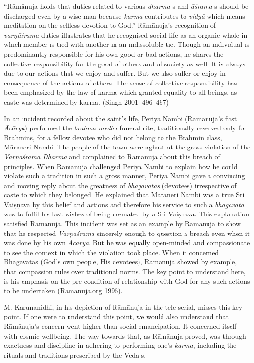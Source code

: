 “Rāmānuja holds that duties related to various \textit{dharma}-s and \textit{āśrama}-s should be discharged even by a wise man because \textit{karma} contributes to \textit{vidyā} which means meditation on the selfless devotion to God.” Rāmānuja’s recognition of \textit{varņāśrama} duties illustrates that he recognised social life as an organic whole in which member is tied with another in an indissoluble tie. Though an individual is predominantly responsible for his own good or bad actions, he shares the collective responsibility for the good of others and of society as well. It is always due to our actions that we enjoy and suffer. But we also suffer or enjoy in consequence of the actions of others. The sense of collective responsibility has been emphasized by the law of karma which granted equality to all beings, as caste was determined by karma. (Singh 2001: 496–497)

In an incident recorded about the saint’s life, Periya Nambi (Rāmānuja’s first \textit{Ācārya}) performed the \textit{brahma medha} funeral rite, traditionally reserved only for Brahmins, for a fellow devotee who did not belong to the Brahmin class, Māraneri Nambi. The people of the town were aghast at the gross violation of the \textit{Varņāśrama Dharma} and complained to Rāmānuja about this breach of principles. When Rāmānuja challenged Periya Nambi to explain how he could violate such a tradition in such a gross manner, Periya Nambi gave a convincing and moving reply about the greatness of \textit{bhāgavatas} (devotees) irrespective of caste to which they belonged. He explained that Māraneri Nambi was a true Sri Vaiṣņava by this belief and actions and therefore his service to such a \textit{bhāgavata} was to fulfil his last wishes of being cremated by a Sri Vaiṣņava. This explanation satisfied Rāmānuja. This incident was set as an example by Rāmānuja to show that he respected\textit{ Varņāśrama} sincerely enough to question a breach even when it was done by his own \textit{Ācārya}. But he was equally open-minded and compassionate to see the context in which the violation took place. When it concerned Bhāgavatas (God’s own people, His devotees), Rāmānuja showed by example, that compassion rules over traditional norms. The key point to understand here, is his emphasis on the pre-condition of relationship with God for any such actions to be undertaken (Rāmānuja.org 1996).

M. Karunanidhi, in his depiction of Rāmānuja in the tele serial, misses this key point. If one were to understand this point, we would also understand that Rāmānuja’s concern went higher than social emancipation. It concerned itself with cosmic wellbeing. The way towards that, as Rāmānuja proved, was through exactness and discipline in adhering to performing one’s \textit{karma}, including the rituals and traditions prescribed by the Veda-s.


